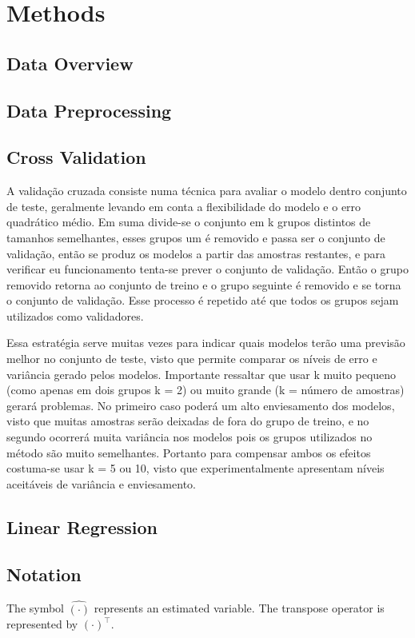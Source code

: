 \section{Methods}

\subsection{Data Overview}

\subsection{Data Preprocessing}

\subsection{Cross Validation}
A validação cruzada consiste numa técnica para avaliar o modelo dentro conjunto de teste, geralmente levando em conta a flexibilidade do modelo e o erro quadrático médio. Em suma divide-se o conjunto em k grupos distintos de tamanhos semelhantes, esses grupos um é removido e passa ser o conjunto de validação, então se produz os modelos a partir das amostras restantes, e para verificar  eu funcionamento tenta-se prever o conjunto de validação. Então o grupo removido retorna ao conjunto de treino e o grupo seguinte é removido e se torna o conjunto de validação. Esse processo é repetido até que todos os grupos sejam utilizados como validadores.

Essa estratégia serve muitas vezes para indicar quais modelos terão uma previsão melhor no conjunto de teste, visto que permite comparar os níveis de erro e variância gerado pelos modelos. Importante ressaltar que usar k muito pequeno (como apenas em dois grupos k = 2) ou muito grande (k = número de amostras) gerará problemas. No primeiro caso poderá um alto enviesamento dos modelos, visto que muitas amostras serão deixadas de fora do grupo de treino, e no segundo ocorrerá muita variância nos modelos pois os grupos utilizados no método são muito semelhantes. Portanto para compensar ambos os efeitos costuma-se usar k = 5 ou 10, visto que experimentalmente apresentam níveis aceitáveis de variância e enviesamento.

\subsection{Linear Regression}
\subsection{Notation}
The symbol $\hat{(\cdot)}$ represents an estimated variable. The transpose operator is represented by $(\cdot)^\intercal$. 

